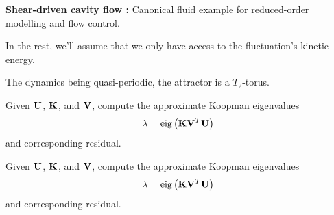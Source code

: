 \documentclass[aspectratio=169, usenames, dvipsnames]{beamer}
\begin{document}
\begin{frame}
  \vfill
  \begin{minipage}{.68\textwidth}
    \textbf{Shear-driven cavity flow :} Canonical fluid example for reduced-order modelling and flow control.

    \bigskip

    In the rest, we'll assume that we only have access to the fluctuation's kinetic energy.
  \end{minipage}%
  \hfill
  \begin{minipage}{.28\textwidth}
    \centering
  \end{minipage}%
  
  \vfill
\end{frame}

\begin{frame}
  \vfill
  \begin{minipage}{.48\textwidth}
    The dynamics being quasi-periodic, the attractor is a $T_2$-torus.
  \end{minipage}%
  \hfill
  \begin{minipage}{.48\textwidth}
    \centering
  \end{minipage}
  \vfill
\end{frame}

\begin{frame}
  \vfill
  \begin{minipage}{.48\textwidth}
    Given $\vb{U}$, $\vb{K}$, and $\vb{V}$, compute the approximate Koopman eigenvalues
    \[
      \lambda = \mathrm{eig}\left( \vb{K} \vb{V}^T \vb{U} \right)
    \]
    and corresponding residual.
  \end{minipage}%
  \hfill
  \begin{minipage}{.48\textwidth}
    \centering
  \end{minipage}

  \vfill
\end{frame}


\begin{frame}
  \vfill
  \begin{minipage}{.48\textwidth}
    Given $\vb{U}$, $\vb{K}$, and $\vb{V}$, compute the approximate Koopman eigenvalues
    \[
      \lambda = \mathrm{eig}\left( \vb{K} \vb{V}^T \vb{U} \right)
    \]
    and corresponding residual.
  \end{minipage}%
  \hfill
  \begin{minipage}{.48\textwidth}
    \centering
  \end{minipage}

  \vfill
\end{frame}
\end{document}
